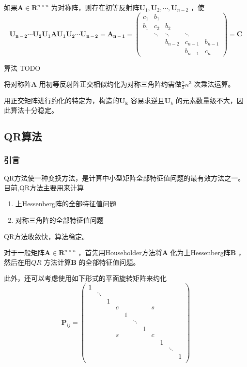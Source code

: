 \documentclass[a4paper]{article}
\begin{document}
\begin{theorem}
	如果$\mathbf{A} \in \mathbf{R}^{n \times n}$ 为对称阵，则存在初等反射阵$\mathbf{U}_1, \mathbf{U}_2, \cdots, \mathbf{U}_{n-2}$ ，使
	\[
		\mathbf{U_{n-2} \cdots U_2 U_1 A U_1 U_2 \cdots U_{n-2}} = \mathbf{A_{n-1}} = \begin{pmatrix}
			c_1 & b_1 & & & \\
			b_1 & c_2 & b_2 & & \\
			    & \ddots & \ddots & \ddots & \\
			    & & b_{n-2} & c_{n-1} & b_{n-1} \\
			    & & & b_{n-1} & c_n 
		\end{pmatrix} 
		= \mathbf{C}
	\] 
\end{theorem}

算法
TODO

将对称阵$\mathbf{A}$ 用初等反射阵正交相似约化为对称三角阵约需做$\frac{2}{3}n^3$ 次乘法运算。

用正交矩阵进行约化的特定为，构造的$\mathbf{U_k}$ 容易求逆且$\mathbf{U}_k$ 的元素数量级不大，因此算法十分稳定。

\subsection{QR算法}
\subsubsection{引言}
QR方法使一种变换方法，是计算中小型矩阵全部特征值问题的最有效方法之一。目前,QR方法主要用来计算
\begin{enumerate}
	\item 上Hessenberg阵的全部特征值问题
	\item 对称三角阵的全部特征值问题
\end{enumerate}
QR方法收敛快，算法稳定。

对于一般矩阵$\mathbf{A} \in \mathbf{R}^{n \times n}$ ，首先用Householder方法将$\mathbf{A}$ 化为上Hessenberg阵$\mathbf{B}$ ，然后在用$QR$ 方法计算$\mathbf{B}$ 的全部特征值问题。

此外，还可以考虑使用如下形式的平面旋转矩阵来约化
\[
\tag{8.4.1} \label{eq:8.4.1} 
\mathbf{P}_{ij} = \begin{pmatrix} 
	 1& & & & & & & & & & \\
	  &\ddots& & & & & & & & & \\
	  & &1& & & & & & & & \\
	  & & &c& & & &s& & & \\
	  & & & &1& & & & & & \\
	  & & & & &\ddots& & & & & \\
	  & & & & & &1& & & & \\
	  & & &s& & & &c& & & \\
	  & & & & & & & &1& & \\
	  & & & & & & & & &\ddots& \\
	  & & & & & & & & & &1\\
\end{pmatrix} 
\] 
\end{document}
